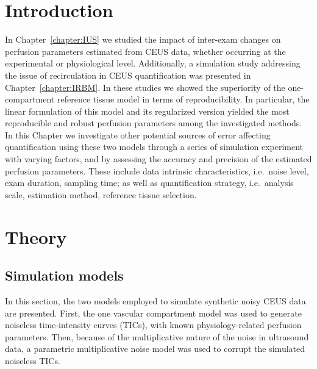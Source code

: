 \section{Introduction}
In Chapter~\ref{chapter:IUS} we studied the impact of inter-exam changes on perfusion parameters estimated from CEUS data, whether occurring at the experimental or physiological level.
Additionally, a simulation study addressing the issue of recirculation in CEUS quantification was presented in Chapter~\ref{chapter:IRBM}.
In these studies we showed the superiority of the one-compartment reference tissue model in terms of reproducibility.
In particular, the linear formulation of this model and its regularized version yielded the most reproducible and robust perfusion parameters among the investigated methods.
In this Chapter we investigate other potential sources of error affecting quantification using these two models through a series of simulation experiment with varying factors, and by assessing the accuracy and precision of the estimated perfusion parameters.
These include data intrinsic characteristics, i.e.~noise level, exam duration, sampling time; as well as quantification strategy, i.e.~analysis scale, estimation method, reference tissue selection.

\section{Theory}
\subsection{Simulation models}
In this section, the two models employed to simulate synthetic noisy CEUS data are presented.
First, the one vascular compartment model was used to generate noiseless time-intensity curves (TICs), with known physiology-related perfusion parameters.
Then, because of the multiplicative nature of the noise in ultrasound data, a parametric multiplicative noise model was used to corrupt the simulated noiseless TICs. 

